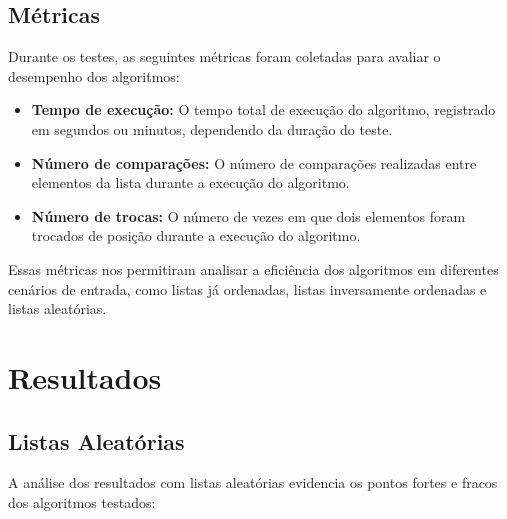 \documentclass[12pt, a4paper]{report}
\begin{document}
\section*{Métricas}

Durante os testes, as seguintes métricas foram coletadas para avaliar o desempenho dos algoritmos:

\begin{itemize}
    \item \textbf{Tempo de execução:} O tempo total de execução do algoritmo, registrado em segundos ou minutos, dependendo da duração do teste.
    \item \textbf{Número de comparações:} O número de comparações realizadas entre elementos da lista durante a execução do algoritmo.
    \item \textbf{Número de trocas:} O número de vezes em que dois elementos foram trocados de posição durante a execução do algoritmo.
\end{itemize}

Essas métricas nos permitiram analisar a eficiência dos algoritmos em diferentes cenários de entrada, como listas já ordenadas, listas inversamente ordenadas e listas aleatórias.


\chapter{Resultados}
\section{Listas Aleatórias}
A análise dos resultados com listas aleatórias evidencia os pontos fortes e fracos dos algoritmos testados:
\end{document}
